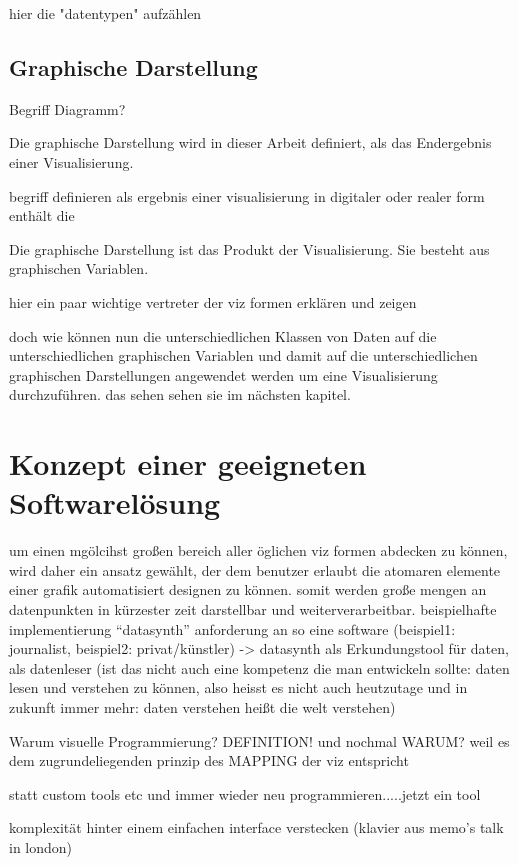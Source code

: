\documentclass[a4paper, 12pt, DIVcalc, onepage, pdftex, headsepline, footsepline]{scrreprt}
\begin{document}
hier die "datentypen" aufzählen

\section{Graphische Darstellung}
\label{sec:Darstellungen}




Begriff Diagramm?

Die graphische Darstellung wird in dieser Arbeit definiert, als das Endergebnis einer
Visualisierung.

begriff definieren als ergebnis einer visualisierung in digitaler oder realer form
enthält die 


Die graphische Darstellung ist das Produkt der Visualisierung. Sie besteht 
aus graphischen Variablen.

hier ein paar wichtige vertreter der viz formen erklären und zeigen

doch wie können nun die unterschiedlichen Klassen von Daten auf die unterschiedlichen graphischen Variablen und damit
auf die unterschiedlichen graphischen Darstellungen angewendet werden um eine Visualisierung durchzuführen. das sehen
sehen sie im nächsten kapitel.

\chapter{Konzept einer geeigneten Softwarelösung}
\label{cha:Software}
um einen mgölcihst großen bereich aller öglichen viz formen abdecken zu können, wird daher ein ansatz gewählt, der dem benutzer erlaubt die atomaren elemente einer grafik automatisiert designen zu können. somit werden große mengen an datenpunkten in kürzester zeit darstellbar und weiterverarbeitbar.
beispielhafte implementierung “datasynth”
anforderung an so eine software (beispiel1: journalist, beispiel2: privat/künstler)
-> datasynth als Erkundungstool für daten, als datenleser (ist das nicht auch eine kompetenz die man entwickeln sollte: daten lesen und verstehen zu können, also heisst es nicht auch heutzutage und in zukunft immer mehr: daten verstehen heißt die welt verstehen)

Warum visuelle Programmierung? DEFINITION! und nochmal WARUM?
weil es dem zugrundeliegenden prinzip des MAPPING der viz entspricht

statt custom tools etc und immer wieder neu programmieren.....jetzt ein tool

komplexität hinter einem einfachen interface verstecken (klavier aus memo’s talk in london)
\end{document}
